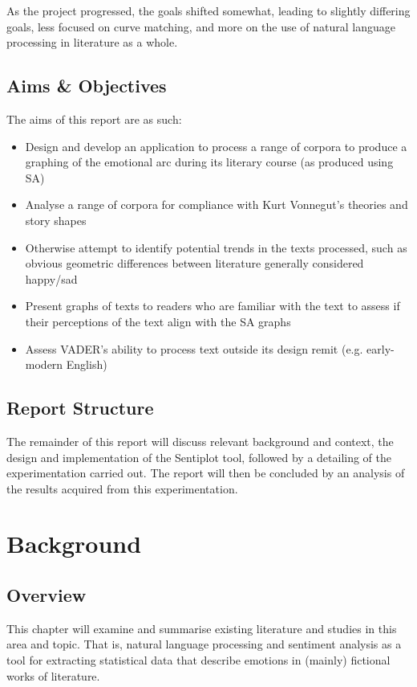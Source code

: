 \documentclass{article}
\begin{document}
        As the project progressed, the goals shifted somewhat, leading to slightly differing goals, less focused on curve matching, and more on the use of natural language processing in literature as a whole.
    \subsection{Aims \& Objectives}
        The aims of this report are as such:
        \begin{itemize}
            \item Design and develop an application to process a range of corpora to produce a graphing of the emotional arc during its literary course (as produced using SA)
            \item Analyse a range of corpora for compliance with Kurt Vonnegut’s theories and story shapes
            \item Otherwise attempt to identify potential trends in the texts processed, such as obvious geometric differences between literature generally considered happy/sad
            \item Present graphs of texts to readers who are familiar with the text to assess if their perceptions of the text align with the SA graphs
            \item Assess VADER's ability to process text outside its design remit (e.g. early-modern English)
        \end{itemize}
    \subsection{Report Structure}
        The remainder of this report will discuss relevant background and context, the design and implementation of the Sentiplot tool, followed by a detailing of the experimentation carried out. The report will then be concluded by an analysis of the results acquired from this experimentation.
\newpage
\section{Background}
\label{sec:background)}
    \subsection{Overview}
        This chapter will examine and summarise existing literature and studies in this area and topic. That is, natural language processing and sentiment analysis as a tool for extracting statistical data that describe emotions in (mainly) fictional works of literature.
\end{document}
